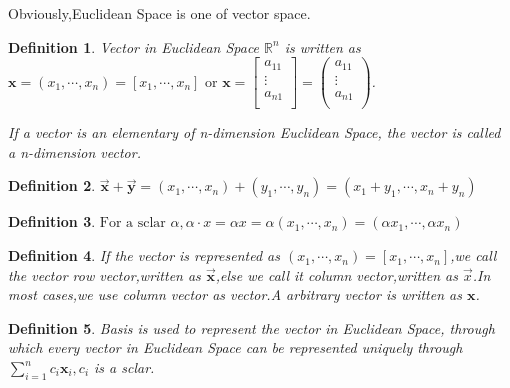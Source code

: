 \documentclass[a4paper,12pt]{report}
\newtheorem{definition}{Definition}[section]     %
\begin{document}
Obviously,Euclidean Space is one of vector space.
\begin{definition}
    Vector in Euclidean Space $\mathbb{R}^n$ is written as $\mathbf{x}=(x_1,\cdots,x_n)=\left[x_1,\cdots,x_n\right]\text{ or }\mathbf{x}=
    \begin{bmatrix}
        a_{11} \\
        \vdots \\
        a_{n1} \\
    \end{bmatrix}
    =
    \left(
        \begin{matrix}
            a_{11} \\
            \vdots \\
            a_{n1} \\
        \end{matrix}
    \right)$.
    
    If a vector is an elementary of n-dimension Euclidean Space, the vector is called a n-dimension vector.
\end{definition}
\begin{definition}
    $\vec{\mathbf{x}}+\vec{\mathbf{y}}=(x_1,\cdots,x_n)+(y_1,\cdots,y_n)=(x_1+y_1,\cdots,x_n+y_n)$
\end{definition}
\begin{definition}
    $\text{For a sclar }\alpha,\alpha\cdot x=\alpha x=\alpha(x_1,\cdots,x_n)=(\alpha x_1,\cdots,\alpha x_n)$
\end{definition}
\begin{definition}
    If the vector is represented as $(x_1,\cdots,x_n)=\left[x_1,\cdots,x_n\right]$,we call the vector row vector,written as $\vec{\mathbf{x}}$,else we call it column vector,written as $\vec{x}$.In most cases,we use column vector as vector.A arbitrary vector is written as $\mathbf{x}$.
\end{definition}
\begin{definition}
    Basis is used to represent the vector in Euclidean Space, through which every vector in Euclidean Space can be represented uniquely through $\sum\limits_{i=1}^{n}c_i\mathbf{x}_i,c_i$ is a sclar. 
\end{definition}
\end{document}
